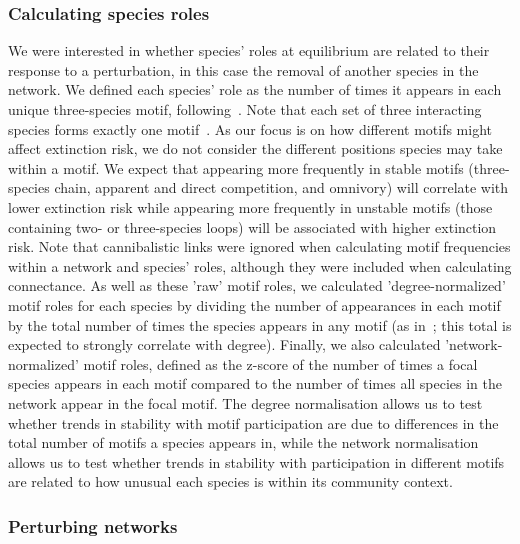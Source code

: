 \documentclass[12pt]{article}
\begin{document}
\begin{spacing}{2.0}
    
    	\subsubsection*{Calculating species roles}
    
    
    		We were interested in whether species' roles at equilibrium are related to their response to a perturbation, in this case the removal of another species in the network. We defined each species' role as the number of times it appears in each unique three-species motif, following~\citet{Stouffer2012,Cirtwill2015}. Note that each set of three interacting species forms exactly one motif~\citep{Cirtwill2018FoodWebs}. As our focus is on how different motifs might affect extinction risk, we do not consider the different positions species may take within a motif. We expect that appearing more frequently in stable motifs (three-species chain, apparent and direct competition, and omnivory) will correlate with lower extinction risk while appearing more frequently in unstable motifs (those containing two- or three-species loops) will be associated with higher extinction risk.	Note that cannibalistic links were ignored when calculating motif frequencies within a network and species' roles, although they were included when calculating connectance. As well as these 'raw' motif roles, we calculated 'degree-normalized' motif roles for each species by dividing the number of appearances in each motif by the total number of times the species appears in any motif (as in~\citet{Cirtwill2015}; this total is expected to strongly correlate with degree). Finally, we also calculated 'network-normalized' motif roles, defined as the z-score of the number of times a focal species appears in each motif compared to the number of times all species in the network appear in the focal motif.
    		The degree normalisation allows us to test whether trends in stability with motif participation are due to differences in the total number of motifs a species appears in, while the network normalisation allows us to test whether trends in stability with participation in different motifs are related to how unusual each species is within its community context.
    
    
    	\subsubsection*{Perturbing networks}
    

\end{spacing}
\end{document}

